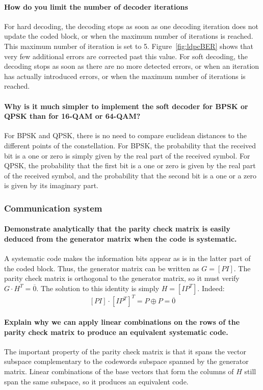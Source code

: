 \paragraph{How do you limit the number of decoder iterations}
For hard decoding, the decoding stops as soon as one decoding iteration does not update the coded block, or when the maximum number of iterations is reached. This maximum number of iteration is set to 5. Figure~\ref{fig:ldpcBER} shows that very few additional errors are corrected past this value.
For soft decoding, the decoding stops as soon as there are no more detected errors, or when an iteration has actually introduced errors, or when the maximum number of iterations is reached.

\paragraph{Why is it much simpler to implement the soft decoder for BPSK or QPSK than for 16-QAM or 64-QAM?}
For BPSK and QPSK, there is no need to compare euclidean distances to the different points of the constellation. For BPSK, the probability that the received bit is a one or zero is simply given by the real part of the received symbol. For QPSK, the probability that the first bit is a one or zero is given by the real part of the received symbol, and the probability that the second bit is a one or a zero is given by its imaginary part.

\subsubsection{Communication system}
\paragraph{Demonstrate analytically that the parity check matrix is easily deduced from
the generator matrix when the code is systematic.}
A systematic code makes the information bits appear as is in the latter part of the coded block. Thus, the generator matrix can be written as $G = [P I]$. The parity check matrix is orthogonal to the generator matrix, so it must verify $G\cdot H^T = \overline{0}$. The solution to this identity is simply $H = [I P^T]$. Indeed:
\[
  [P I]\cdot[I P^T]^T = P \oplus P = \overline{0}
\]

\paragraph{Explain why we can apply linear combinations on the rows of the parity check matrix to
produce an equivalent systematic code.}
The important property of the parity check matrix is that it spans the vector subspace complementary to the codewords subspace spanned by the generator matrix. Linear combinations of the base vectors that form the columns of $H$ still span the same subspace, so it produces an equivalent code.

